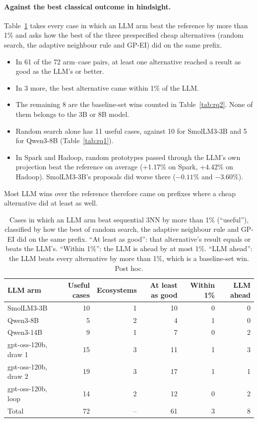 \paragraph{Against the best classical outcome in hindsight.} Table~\ref{tab:match} takes every case in which an LLM arm beat the reference by more than 1\% and asks how the best of the three prespecified cheap alternatives (random search, the adaptive neighbour rule and GP-EI) did on the same prefix.
\begin{itemize}
  \item In 61 of the 72 arm--case pairs, at least one alternative reached a result as good as the LLM's or better.
  \item In 3 more, the best alternative came within 1\% of the LLM.
  \item The remaining 8 are the baseline-set wins counted in Table~\ref{tab:rq2}. None of them belongs to the 3B or 8B model.
  \item Random search alone has 11 useful cases, against 10 for SmolLM3-3B and 5 for Qwen3-8B (Table~\ref{tab:rq1}).
  \item In Spark and Hadoop, random prototypes passed through the LLM's own projection beat the reference on average (+1.17\% on Spark, +4.42\% on Hadoop). SmolLM3-3B's proposals did worse there ($-0.11\%$ and $-3.60\%$).
\end{itemize}
Most LLM wins over the reference therefore came on prefixes where a cheap alternative did at least as well.

\begin{table}[t]
\centering
\caption{Cases in which an LLM arm beat sequential 3NN by more than 1\% (``useful''), classified by how the best of random search, the adaptive neighbour rule and GP-EI did on the same prefix. ``At least as good'': that alternative's result equals or beats the LLM's. ``Within 1\%'': the LLM is ahead by at most 1\%. ``LLM ahead'': the LLM beats every alternative by more than 1\%, which is a baseline-set win. Post hoc.}
\label{tab:match}
\small
\begin{tabular}{lrrrrr}
\toprule
LLM arm & Useful cases & Ecosystems & At least as good & Within 1\% & LLM ahead \\
\midrule
SmolLM3-3B & 10 & 1 & 10 & 0 & 0 \\
Qwen3-8B & 5 & 2 & 4 & 1 & 0 \\
Qwen3-14B & 9 & 1 & 7 & 0 & 2 \\
gpt-oss-120b, draw 1 & 15 & 3 & 11 & 1 & 3 \\
gpt-oss-120b, draw 2 & 19 & 3 & 17 & 1 & 1 \\
gpt-oss-120b, loop & 14 & 2 & 12 & 0 & 2 \\
\midrule
Total & 72 & -- & 61 & 3 & 8 \\
\bottomrule
\end{tabular}
\end{table}

